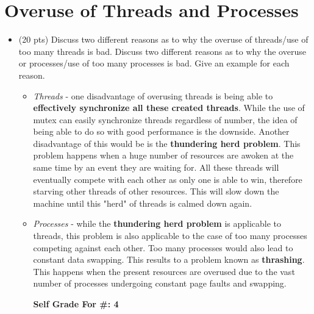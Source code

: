 \documentclass[conference]{IEEEtran}
\begin{document}
\section{Overuse of Threads and Processes}
\begin{itemize}
	\item (20 pts) Discuss two different reasons as to why the overuse
	of threads/use of too many threads is bad. Discuss two different reasons as to why the overuse
	or processes/use of too many processes is bad. Give an example for each reason.
	\begin{itemize} 
		\item \textit{Threads} - one disadvantage of overusing threads is being able to \textbf{effectively synchronize all these created threads}. While the use of mutex can easily synchronize threads regardless of number, the idea of being able to do so with good performance is the downside. Another disadvantage of this would be is the \textbf{thundering herd problem}. This problem happens when a huge number of resources are awoken at the same time by an event they are waiting for. All these threads will eventually compete with each other as only one is able to win, therefore starving other threads of other resources. This will slow down the machine until this "herd" of threads is calmed down again.
		\item \textit{Processes} - while the \textbf{thundering herd problem} is applicable to threads, this problem is also applicable to the case of too many processes competing against each other. Too many processes would also lead to constant data swapping. This results to a problem known as \textbf{thrashing}. This happens when the present resources are overused due to the vast number of processes undergoing constant page faults and swapping.
		\begin{center}
			\textbf{Self Grade For \#: 4}
		\end{center}
	\end{itemize}
\end{itemize}

\end{document}
